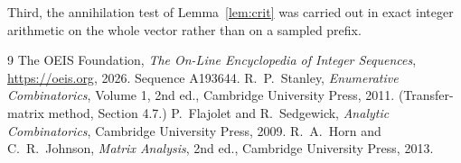 \documentclass[11pt,a4paper]{article}
\theoremstyle{plain}
\theoremstyle{definition}
\begin{document}
Third, the annihilation test of Lemma~\ref{lem:crit} was carried out in exact integer
arithmetic on the whole vector rather than on a sampled prefix.

\begin{thebibliography}{9}
 The OEIS Foundation, \emph{The On-Line Encyclopedia of Integer
Sequences}, \url{https://oeis.org}, 2026. Sequence A193644.
 R.~P.~Stanley, \emph{Enumerative Combinatorics}, Volume 1, 2nd ed.,
Cambridge University Press, 2011. (Transfer-matrix method, Section 4.7.)
 P.~Flajolet and R.~Sedgewick, \emph{Analytic Combinatorics}, Cambridge
University Press, 2009.
 R.~A.~Horn and C.~R.~Johnson, \emph{Matrix Analysis}, 2nd ed., Cambridge
University Press, 2013.
\end{thebibliography}
\end{document}
